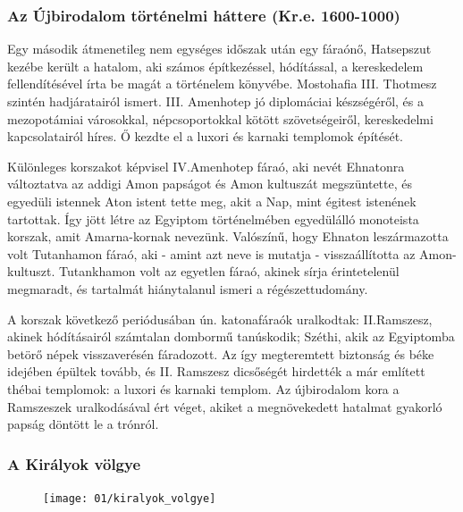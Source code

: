 \subsubsection*{Az Újbirodalom történelmi háttere (Kr.e. 1600-1000)}

Egy második átmenetileg nem egységes időszak után egy fáraónő, Hatsepszut kezébe került a hatalom, aki számos építkezéssel, hódítással, a kereskedelem fellendítésével írta be magát a történelem könyvébe. Mostohafia III. Thotmesz szintén hadjáratairól ismert. III. Amenhotep jó diplomáciai készségéről, és a mezopotámiai városokkal, népcsoportokkal kötött szövetségeiről, kereskedelmi kapcsolatairól híres. Ő kezdte el a luxori és karnaki templomok építését.

Különleges korszakot képvisel IV.Amenhotep fáraó, aki nevét Ehnatonra változtatva az addigi Amon papságot és Amon kultuszát megszüntette, és egyedüli istennek Aton istent tette meg, akit a Nap, mint égitest istenének tartottak. Így jött létre az Egyiptom történelmében egyedülálló monoteista korszak, amit Amarna-kornak nevezünk. Valószínű, hogy Ehnaton leszármazotta volt Tutanhamon fáraó, aki - amint azt neve is mutatja - visszaállította az Amon-kultuszt. Tutankhamon volt az egyetlen fáraó, akinek sírja érintetelenül megmaradt, és tartalmát hiánytalanul ismeri a régészettudomány.

A korszak következő periódusában ún. katonafáraók uralkodtak: II.Ramszesz, akinek hódításairól számtalan dombormű tanúskodik; Széthi, akik az Egyiptomba betörő népek visszaverésén fáradozott. Az így megteremtett biztonság és béke idejében épültek tovább, és II. Ramszesz dicsőségét hirdették a már említett thébai templomok: a luxori és karnaki templom. Az újbirodalom kora a Ramszeszek uralkodásával ért véget, akiket a megnövekedett hatalmat gyakorló papság döntött le a trónról.

\subsubsection*{A Királyok völgye}

\begin{figure}
	\begin{tcolorbox}[enhanced,colframe=gray!50!white,
		colbacktitle=gray!15!white,
		coltitle=gray!50!black,
		borderline={0.5mm}{0mm}{gray!15!white},
		borderline={0.5mm}{0mm}{gray!50!white,dashed},
		attach boxed title to top center={yshift=-2mm},
		boxed title style={boxrule=0.4pt},
		title=Királyok völgye]{
			\texttt{[image: 01/kiralyok\_volgye]}}
	\end{tcolorbox}
\end{figure}

